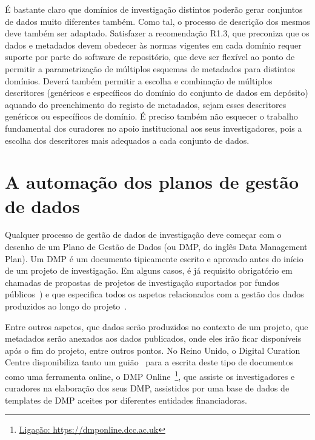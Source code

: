 \documentclass[sigconf,nonacm]{acmart}
\begin{document}
É bastante claro que domínios de investigação distintos poderão gerar conjuntos de dados muito diferentes também. Como tal, o processo de descrição dos mesmos deve também ser adaptado. Satisfazer a recomendação R1.3, que preconiza que os dados e metadados devem obedecer às normas vigentes em cada domínio requer suporte por parte do software de repositório, que deve ser flexível ao ponto de permitir a parametrização de múltiplos esquemas de metadados para distintos domínios. Deverá também permitir a escolha e combinação de múltiplos descritores (genéricos e específicos do domínio do conjunto de dados em depósito) aquando do preenchimento do registo de metadados, sejam esses descritores genéricos ou específicos de domínio. É preciso também não esquecer o trabalho fundamental dos curadores no apoio institucional aos seus investigadores, pois a escolha dos descritores mais adequados a cada conjunto de dados.


\section{A automação dos planos de gestão de dados} %
\label{sec:a_automacao_dos_planos_de_gestao_de_dados}

Qualquer processo de gestão de dados de investigação deve começar com o desenho de um Plano de Gestão de Dados (ou DMP, do inglês Data Management Plan). Um DMP é um documento tipicamente escrito e aprovado antes do início de um projeto de investigação. Em alguns casos, é já requisito obrigatório em chamadas de propostas de projetos de investigação suportados por fundos públicos~\cite{Foundation2011}) e que especifica todos os aspetos relacionados com a gestão dos dados produzidos ao longo do projeto~\cite{10.1371/journal.pcbi.1004525}.  

Entre outros aspetos, que dados serão produzidos no contexto de um projeto, que metadados serão anexados aos dados publicados, onde eles irão ficar disponíveis após o fim do projeto, entre outros pontos. No Reino Unido, o Digital Curation Centre disponibiliza tanto um guião~\cite{jones_dmp} para a escrita deste tipo de documentos como uma ferramenta online, o DMP Online~\footnote{\url{Ligação: https://dmponline.dcc.ac.uk}}, que assiste os investigadores e curadores na elaboração dos seus DMP, assistidos por uma base de dados de templates de DMP aceites por diferentes entidades financiadoras.
\end{document}
